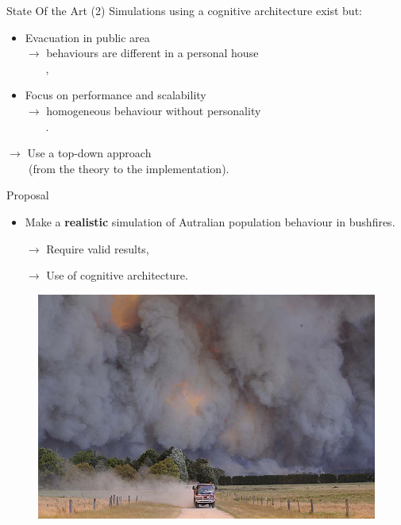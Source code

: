 \documentclass{beamer}
\begin{document}
		\begin{frame}{State Of the Art (2)}
			Simulations using a cognitive architecture exist but:
			\begin{itemize}
				\item Evacuation in public area \\ \qquad $\rightarrow$ behaviours are different in a personal house \\ \qquad ~~~ \cite{tsai2011},
				\item Focus on performance and scalability \\ \qquad $\rightarrow$ homogeneous behaviour without personality \\ \qquad ~~~ \cite{Cho2008}.
			\end{itemize}
			\vspace{2em}
			$\rightarrow$ Use a top-down approach \\ ~~~~(from the theory to the implementation).
		\end{frame}

    \begin{frame}{Proposal}
      \begin{itemize}
        \item Make a \textbf{realistic} simulation of Autralian population behaviour in bushfires.
        \item[$\rightarrow$] Require valid results,
        \item[$\rightarrow$] Use of cognitive architecture.
      \end{itemize}
      \begin{figure}[h]
        \includegraphics[scale=0.3]{PJ-1.jpg}
      \end{figure}
    \end{frame}
\end{document}
